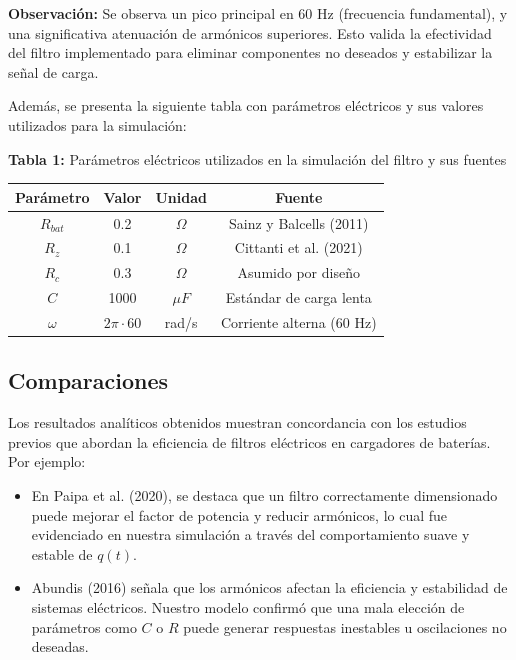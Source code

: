 \textbf{Observación:} Se observa un pico principal en 60 Hz (frecuencia fundamental), y una significativa atenuación de armónicos superiores. Esto valida la efectividad del filtro implementado para eliminar componentes no deseados y estabilizar la señal de carga.

\vspace{0.5cm}
Además, se presenta la siguiente tabla con parámetros eléctricos y sus valores utilizados para la simulación:

\textbf{Tabla 1:} Parámetros eléctricos utilizados en la simulación del filtro y sus fuentes

\begin{table}[H]
	\centering
	\begin{tabular}{|c|c|c|c|}
		\hline
		\textbf{Parámetro} & \textbf{Valor}    & \textbf{Unidad} & \textbf{Fuente}           \\
		\hline
		\( R_{bat} \)      & 0.2               & \(\Omega\)      & Sainz y Balcells (2011)   \\
		\hline
		\( R_z \)          & 0.1               & \(\Omega\)      & Cittanti et al. (2021)    \\
		\hline
		\( R_c \)          & 0.3               & \(\Omega\)      & Asumido por diseño        \\
		\hline
		\( C \)            & 1000              & \(\mu F\)       & Estándar de carga lenta   \\
		\hline
		\( \omega \)       & \(2\pi \cdot 60\) & rad/s           & Corriente alterna (60 Hz) \\
		\hline
	\end{tabular}
\end{table}
\subsection{Comparaciones}
Los resultados analíticos obtenidos muestran concordancia con los estudios previos que abordan la eficiencia de filtros eléctricos en cargadores de baterías. Por ejemplo:

\begin{itemize}
	\item En Paipa et al. (2020), se destaca que un filtro correctamente dimensionado puede mejorar el factor de potencia y reducir armónicos, lo cual fue evidenciado en nuestra simulación a través del comportamiento suave y estable de $q(t)$.

	\item Abundis (2016) señala que los armónicos afectan la eficiencia y estabilidad de sistemas eléctricos. Nuestro modelo confirmó que una mala elección de parámetros como $C$ o $R$ puede generar respuestas inestables u oscilaciones no deseadas.
\end{itemize}

